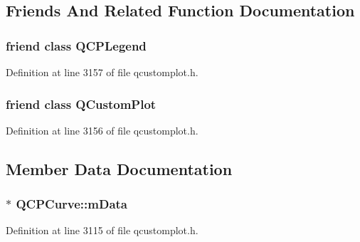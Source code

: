 \subsection{Friends And Related Function Documentation}
\hypertarget{class_q_c_p_curve_a8429035e7adfbd7f05805a6530ad5e3b}{}
\subsubsection[{Q\+C\+P\+Legend}]{\setlength{\rightskip}{0pt plus 5cm}friend class {\bf Q\+C\+P\+Legend}\hspace{0.3cm}{\ttfamily [friend]}}\label{class_q_c_p_curve_a8429035e7adfbd7f05805a6530ad5e3b}


Definition at line 3157 of file qcustomplot.\+h.

\hypertarget{class_q_c_p_curve_a1cdf9df76adcfae45261690aa0ca2198}{}
\subsubsection[{Q\+Custom\+Plot}]{\setlength{\rightskip}{0pt plus 5cm}friend class {\bf Q\+Custom\+Plot}\hspace{0.3cm}{\ttfamily [friend]}}\label{class_q_c_p_curve_a1cdf9df76adcfae45261690aa0ca2198}


Definition at line 3156 of file qcustomplot.\+h.



\subsection{Member Data Documentation}
\hypertarget{class_q_c_p_curve_a88d533e455bca96004b049e99168731b}{}
\subsubsection[{m\+Data}]{$\ast$ Q\+C\+P\+Curve\+::m\+Data\hspace{0.3cm}{\ttfamily [protected]}}\label{class_q_c_p_curve_a88d533e455bca96004b049e99168731b}


Definition at line 3115 of file qcustomplot.\+h.



